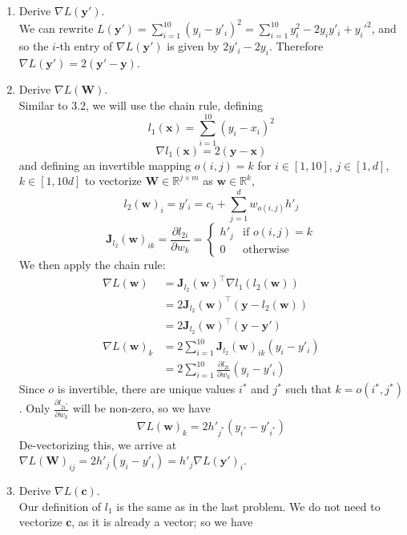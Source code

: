 \documentclass{article}
\begin{document}
\begin{enumerate}[label=\arabic*.]
\item Derive $\nabla L(\mathbf{y'})$.\\
	{\color{blue}We can rewrite $L(\mathbf{y'}) = \sum_{i=1}^{10} (y_i - y'_i)^2 = \sum_{i=1}^{10}y_i^2 - 2y_iy'_i + y_i'^{2}$, and so the $i$-th entry of $\nabla L(\mathbf{y'})$ is given by $2y'_i - 2y_i$. Therefore $\nabla L(\mathbf{y'}) = 2(\mathbf{y' - y})$.}
\item Derive $\nabla L(\mathbf{W})$.\\
	{\color{blue}Similar to 3.2, we will use the chain rule, defining
	$$l_1(\mathbf{x}) = \sum_{i=1}^{10}(y_i - x_i)^2$$
	$$\nabla l_1(\mathbf{x}) = 2(\mathbf{y - x})$$
	and defining an invertible mapping $o(i, j) = k$ for $i \in [1, 10]$, $j \in [1, d]$, $k \in [1, 10d]$ to vectorize $\mathbf{W} \in \mathbb{R}^{j \times m}$ as $\mathbf{w} \in \mathbb{R}^k$,
	$$l_2(\mathbf{w})_i = y'_i = c_i + \sum_{j=1}^d w_{o(i,j)}h'_j$$
	$$\mathbf{J}_{l_2}(\mathbf{w})_{ik} = \frac{\partial l_{2i}}{\partial w_k} = \begin{cases} h'_j & \text{if } o(i,j)=k \\ 0 & \text{otherwise}\end{cases}$$
	We then apply the chain rule:
	\begin{align*}
	\nabla L(\mathbf{w}) &= \mathbf{J}_{l_2}(\mathbf{w})^\top\nabla l_1(l_2(\mathbf{w}))\\
	&= 2\mathbf{J}_{l_2}(\mathbf{w})^\top(\mathbf{y} - l_2(\mathbf{w}))\\
	&= 2\mathbf{J}_{l_2}(\mathbf{w})^\top(\mathbf{y - y'})\\
	\nabla L(\mathbf{w})_k &= 2\sum_{i=1}^{10}\mathbf{J}_{l_2}(\mathbf{w})_{ik}(y_i - y'_i)\\
	&= 2\sum_{i=1}^{10}\frac{\partial l_{2i}}{\partial w_k}(y_i - y'_i)
	\end{align*}
	Since $o$ is invertible, there are unique values $i^*$ and $j^*$ such that $k = o(i^*, j^*)$. Only $\frac{\partial l_{2i^*}}{\partial w_{k}}$ will be non-zero, so we have
	$$\nabla L(\mathbf{w})_k = 2h'_{j^*}(y_{i^*} - y'_{i^*})$$
	De-vectorizing this, we arrive at $\nabla L(\mathbf{W})_{ij} = 2h'_j(y_i - y'_i) = h'_j\nabla L(\mathbf{y'})_i$.
	}
\item Derive $\nabla L(\mathbf{c})$.\\
	{\color{blue} Our definition of $l_1$ is the same as in the last problem. We do not need to vectorize $\mathbf{c}$, as it is already a vector; so we have
		\begin{align*}

\end{align*}}
\end{enumerate}
\end{document}
